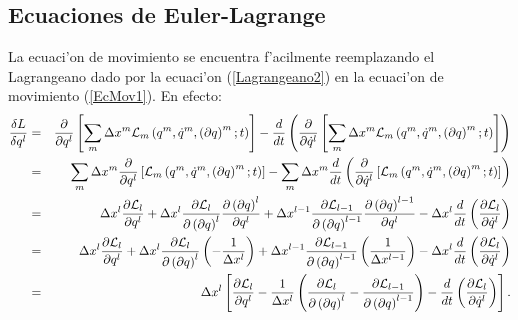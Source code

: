 \subsection{Ecuaciones de Euler-Lagrange}\label{sec-el}
La ecuaci'on de movimiento se encuentra f'acilmente
reemplazando el Lagrangeano dado por la ecuaci'on (\ref{Lagrangeano2}) en la
ecuaci'on de movimiento (\ref{EcMov1}). En efecto:
\begin{eqnarray}
\frac{\delta L}{\delta q^l}&=&\frac{\partial}{\partial q^{l}}\left[
\sum_{m}\Delta x^{m}{\cal L}_{m}\left(
q^{m},\dot{q}^{m},\left( \partial q\right) ^{m};t\right) \right]
-\frac{d}{d t}\left( \frac{\partial}{\partial\dot{q}^{l}}\left[ \sum_{m}\Delta
x^{m}{\cal L}_{m}\left( q^{m},\dot{q}^{m},\left(\partial q\right) ^{m};t\right)
\right] \right) \\
&=&\sum_{m}\Delta x^{m}\frac{\partial}{\partial q^{l}}\left[ {\cal L}_{m}\left(
q^{m},\dot{q}^{m},\left( \partial q\right) ^{m};t\right) \right] -\sum
_{m}\Delta x^{m}\frac{d}{dt}\left( \frac{\partial}{\partial\dot{q}^{l}}\left[
{\cal L}_{m}\left( q^{m},\dot{q}^{m},\left(\partial q\right) ^{m};t\right)
\right] \right)\\
&=& \Delta x^l\frac{\partial{\cal L}_{l}}{\partial q^{l}}+\Delta
x^l\frac{\partial{\cal L}_{l}}{\partial\left( \partial q\right)
^{l}}\frac{\partial\left( \partial q\right) ^{l}}{\partial q^{l}}+\Delta
x^{l-1}\frac{\partial{\cal L}_{l-1}}{\partial\left( \partial q\right)
^{l-1}}\frac{\partial\left( \partial q\right) ^{l-1}}{\partial q^{l}}-\Delta
x^l\frac{d}{dt}\left(\frac{\partial{\cal L}_{l}}{\partial\dot{q}^{l}}\right)\\
 &=&\Delta x^l\frac{\partial{\cal L}_{l}}{\partial q^{l}}+\Delta
x^l\frac{\partial{\cal L}_{l}}{\partial\left( \partial q\right)
^{l}}\left(-\frac{1}{\Delta x^{l}}\right) +\Delta x^{l-1}\frac{\partial{\cal
L}_{l-1}}{\partial\left(
\partial q\right) ^{l-1}}\left( \frac{1}{\Delta x^{l-1}}\right)-\Delta
x^l\frac{d}{dt}\left( \frac{\partial{\cal L}_{l}}{\partial
\dot{q}^{l}}\right) \\
&=& \Delta x^l\left[\frac{\partial{\cal L}_{l}}{\partial q^{l}}-\frac{1}{\Delta
x^{l}}\left( \frac{\partial{\cal L}_{l}}{\partial\left(\partial
q\right)^{l}}-\frac{\partial{\cal L}_{l-1}}{\partial\left(\partial q\right)
^{l-1}}\right)-\frac{d}{dt}\left(\frac{\partial{\cal
L}_{l}}{\partial\dot{q}^{l}}\right)\right]  .\label{eqdisc}
\end{eqnarray}


